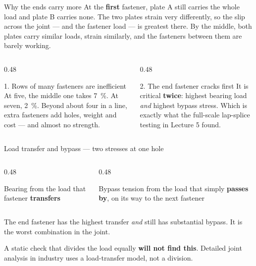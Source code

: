 \documentclass[aspectratio=169,10pt]{beamer}
\begin{document}
\begin{frame}{Why the ends carry more}
At the \textbf{first} fastener, plate A still carries the whole load and plate B carries none. The
two plates strain very differently, so the slip across the joint --- and the fastener load --- is
greatest there.
\vspace{2pt}
By the middle, both plates carry similar loads, strain similarly, and the fasteners between them are
barely working.
\vfill
\begin{columns}[T]
\begin{column}{0.48\textwidth}
\begin{alertblock}{1. Rows of many fasteners are inefficient}
At five, the middle one takes \SI{7}{\percent}. At seven, \SI{2}{\percent}.
\vspace{2pt}
Beyond about four in a line, extra fasteners add holes, weight and cost --- and almost no strength.
\end{alertblock}
\end{column}
\begin{column}{0.48\textwidth}
\begin{alertblock}{2. The end fastener cracks first}
It is critical \textbf{twice}: highest bearing load \emph{and} highest bypass stress.
\vspace{2pt}
Which is exactly what the full-scale lap-splice testing in Lecture 5 found.
\end{alertblock}
\end{column}
\end{columns}
\end{frame}

\begin{frame}{Load transfer and bypass --- two stresses at one hole}
\begin{columns}[T]
\begin{column}{0.48\textwidth}
\begin{block}{Bearing}
from the load that fastener \textbf{transfers}
\end{block}
\end{column}
\begin{column}{0.48\textwidth}
\begin{block}{Bypass}
tension from the load that simply \textbf{passes by}, on its way to the next fastener
\end{block}
\end{column}
\end{columns}
\vfill
The end fastener has the highest transfer \emph{and} still has substantial bypass. It is the worst
combination in the joint.
\vfill
\begin{alertblock}{}
\centering
A static check that divides the load equally \textbf{will not find this}. Detailed joint analysis in
industry uses a load-transfer model, not a division.
\end{alertblock}
\end{frame}
\end{document}
